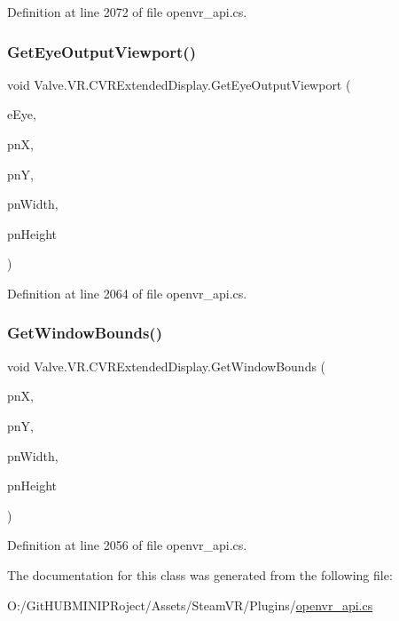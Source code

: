 Definition at line 2072 of file openvr\+\_\+api.\+cs.

\mbox{\label{class_valve_1_1_v_r_1_1_c_v_r_extended_display_a2dee10b99a57a5ec2b86ea04f503cfbb}} 
\subsubsection{\texorpdfstring{GetEyeOutputViewport()}{GetEyeOutputViewport()}}
{\footnotesize\ttfamily void Valve.\+V\+R.\+C\+V\+R\+Extended\+Display.\+Get\+Eye\+Output\+Viewport (\begin{DoxyParamCaption}\item[{\mbox{\hyperlink{namespace_valve_1_1_v_r_a8153d4a3e627e1cede046327087c1880}{E\+V\+R\+Eye}}}]{e\+Eye,  }\item[{ref uint}]{pnX,  }\item[{ref uint}]{pnY,  }\item[{ref uint}]{pn\+Width,  }\item[{ref uint}]{pn\+Height }\end{DoxyParamCaption})}



Definition at line 2064 of file openvr\+\_\+api.\+cs.

\mbox{\label{class_valve_1_1_v_r_1_1_c_v_r_extended_display_a8cf81a83bf150fed4862c72e8e21b563}} 
\subsubsection{\texorpdfstring{GetWindowBounds()}{GetWindowBounds()}}
{\footnotesize\ttfamily void Valve.\+V\+R.\+C\+V\+R\+Extended\+Display.\+Get\+Window\+Bounds (\begin{DoxyParamCaption}\item[{ref int}]{pnX,  }\item[{ref int}]{pnY,  }\item[{ref uint}]{pn\+Width,  }\item[{ref uint}]{pn\+Height }\end{DoxyParamCaption})}



Definition at line 2056 of file openvr\+\_\+api.\+cs.



The documentation for this class was generated from the following file\+:\begin{DoxyCompactItemize}
\item 
O\+:/\+Git\+H\+U\+B\+M\+I\+N\+I\+P\+Roject/\+Assets/\+Steam\+V\+R/\+Plugins/\mbox{\hyperlink{openvr__api_8cs}{openvr\+\_\+api.\+cs}}\end{DoxyCompactItemize}
